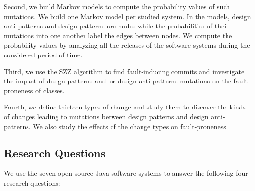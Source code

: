 Second, we build Markov models \cite{meyn2012markov} to compute the probability values of such mutations. We build one Markov model per studied system. In the models, design anti-patterns and design patterns are nodes while the probabilities of their mutations into one another label the edges between nodes. We compute the probability values by analyzing all the releases of the software systems during the considered period of time.

Third, we use the SZZ algorithm  \cite{sliwerski2005changes} to find fault-inducing commits and investigate the impact of design patterns and--or design anti-patterns mutations on the fault-proneness of classes. 

Fourth, we define thirteen types of change and study them to discover the kinds of changes leading to mutations between design patterns and design anti-patterns. We also study the effects of the change types on fault-proneness. 



\subsection{Research Questions} \label{RQuestions}


We use the seven open-source Java software systems to answer the following four research questions: 

